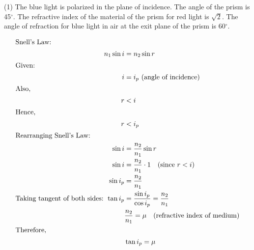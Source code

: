         \begin{tasks}(1)
            \task The blue light is polarized in the plane of incidence. \ans
            \task The angle of the prism is 45\(^{\circ}\).
            \task The refractive index of the material of the prism for red light is \( \sqrt{2} \). \ans
            \task The angle of refraction for blue light in air at the exit plane of the prism is 60\(^{\circ}\). \ans
        \end{tasks}

    \begin{solution}
        \begin{align*}
            \intertext{Snell's Law: }
            n_1 \sin i &= n_2 \sin r \\
            \intertext{Given: } 
            i &= i_p \text{ (angle of incidence)} \\
            \intertext{Also, } 
            r &< i \\
            \intertext{Hence, }
            r &< i_p \\
            \intertext{Rearranging Snell's Law: } 
            \sin i &= \frac{n_2}{n_1} \sin r \\
            \sin i &= \frac{n_2}{n_1} \cdot 1 \quad \text{(since } r < i) \\
            \sin i_p &= \frac{n_2}{n_1} \\
            \text{Taking tangent of both sides: }
            \tan i_p &= \frac{\sin i_p}{\cos i_p} = \frac{n_2}{n_1} \\
            & \frac{n_2}{n_1} = \mu \quad \text{(refractive index of medium)} \\
            \intertext{Therefore, } & \tan i_p = \mu
        \end{align*}
        

\end{solution}
